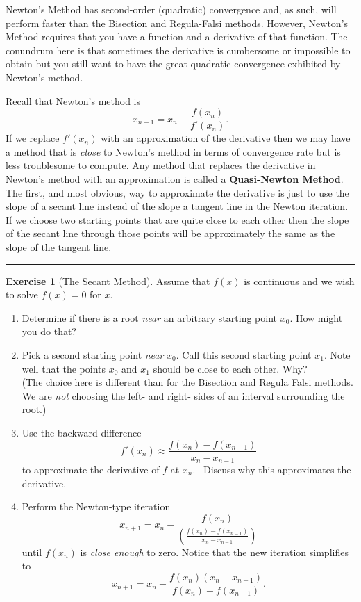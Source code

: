 \documentclass[
]{book}
\theoremstyle{definition}
\theoremstyle{definition}
\theoremstyle{definition}
\newtheorem{exercise}{Exercise}[chapter]
\theoremstyle{remark}
\begin{document}
Newton's Method has second-order (quadratic) convergence and, as such, will perform faster than the Bisection and Regula-Falsi methods. However, Newton's Method requires that you have a function and a derivative of that function. The conundrum here is that sometimes the derivative is cumbersome or impossible to obtain but you still want to have the great quadratic convergence exhibited by Newton's method.

Recall that Newton's method is
\[x_{n+1} = x_n - \frac{f(x_n)}{f'(x_n)}.\] If we replace \(f'(x_n)\) with
an approximation of the derivative then we may have a method that is
\emph{close} to Newton's method in terms of convergence rate but is less
troublesome to compute. Any method that replaces the derivative in
Newton's method with an approximation is called a \textbf{Quasi-Newton
Method}. The first, and most obvious, way to approximate the derivative is just to
use the slope of a secant line instead of the slope a tangent line in the Newton iteration. If
we choose two starting points that are quite close to each other then
the slope of the secant line through those points will be approximately
the same as the slope of the tangent line.

\begin{center}\rule{0.5\linewidth}{0.5pt}\end{center}

\begin{exercise}[The Secant Method]
\protect\hypertarget{exr:secant-method}{}{\label{exr:secant-method} {} }Assume that \(f(x)\) is continuous and we wish to solve \(f(x) = 0\) for
\(x\).

\begin{enumerate}
\def\labelenumi{\arabic{enumi}.}
\item
  Determine if there is a root \emph{near} an arbitrary starting point
  \(x_0\). How might you do that?
\item
  Pick a second starting point \emph{near} \(x_0\). Call this second starting
  point \(x_1\). Note well that the points \(x_0\) and \(x_1\) should be
  close to each other. Why?\\
  (The choice here is different than for the Bisection and Regula
  Falsi methods. We are \emph{not} choosing the left- and right- sides of an interval surrounding the root.)
\item
  Use the backward difference
  \[f'(x_n) \approx \frac{f(x_n) - f(x_{n-1})}{x_n - x_{n-1}}\] to
  approximate the derivative of \(f\) at \(x_n\). ~Discuss why this approximates the derivative.
\item
  Perform the Newton-type iteration
  \[x_{n+1} = x_n - \frac{f(x_n)}{ \left(  \frac{f(x_n) - f(x_{n-1})}{x_n - x_{n-1}}\right)}\]
  until \(f(x_n)\) is \emph{close enough} to zero. Notice that the new
  iteration simplifies to
  \[x_{n+1} = x_n - \frac{f(x_n)\left( x_n - x_{n-1} \right)}{f(x_n) -
              f(x_{n-1})}.\]
\end{enumerate}
\end{exercise}
\end{document}
